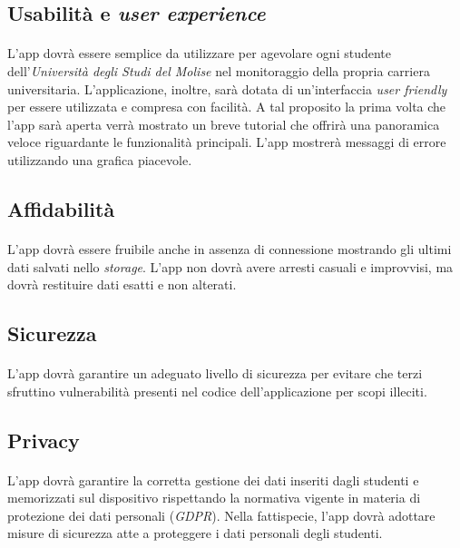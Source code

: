 \subsection{Usabilità e \textit{user experience}}
\paragraph{} 
L’app dovrà essere semplice da utilizzare per agevolare ogni studente dell’\textit{Università degli Studi del Molise} nel monitoraggio della propria carriera universitaria. L’applicazione, inoltre, sarà dotata di un’interfaccia \textit{user friendly} per essere utilizzata e compresa con facilità. A tal proposito la prima volta che l’app sarà aperta verrà mostrato un breve tutorial che offrirà una panoramica veloce riguardante le funzionalità principali. L’app mostrerà messaggi di errore utilizzando una grafica piacevole.

\subsection{Affidabilità}
\paragraph{} 
L’app dovrà essere fruibile anche in assenza di connessione mostrando gli ultimi dati salvati nello \textit{storage}. L’app non dovrà avere arresti casuali e improvvisi, ma dovrà restituire dati esatti e non alterati.

\subsection{Sicurezza}
\paragraph{} 
L’app dovrà garantire un adeguato livello di sicurezza per evitare che terzi sfruttino vulnerabilità presenti nel codice dell’applicazione per scopi illeciti.

\subsection{Privacy}
\paragraph{} 
L’app dovrà garantire la corretta gestione dei dati inseriti dagli studenti e memorizzati sul dispositivo rispettando la normativa vigente in materia di protezione dei dati personali (\textit{GDPR}). Nella fattispecie, l’app dovrà adottare misure di sicurezza atte a proteggere i dati personali degli studenti.

